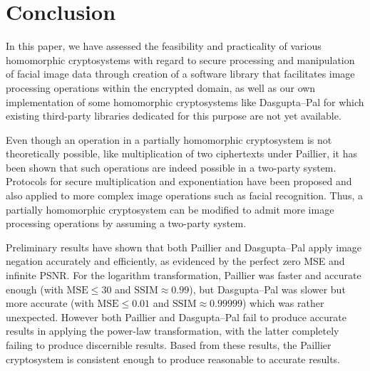 \begin{table}[h]
\begin{tabular}{lcccccc}
		\bottomrule
        \end{tabular}
\end{table}


\section{Conclusion}
In this paper, we have assessed the feasibility and practicality of various homomorphic cryptosystems with regard to secure processing and manipulation of facial image data through creation of a software library that facilitates image processing operations within the encrypted domain, as well as our own implementation of some homomorphic cryptosystems like Dasgupta--Pal for which existing third-party libraries dedicated for this purpose are not yet available.


Even though an operation in a partially homomorphic cryptosystem is not theoretically possible, like multiplication of two ciphertexts under Paillier, it has been shown that such operations are indeed possible in a two-party system. Protocols for secure multiplication and exponentiation have been proposed and also applied to more complex image operations such as facial recognition. Thus, a partially homomorphic cryptosystem can be modified to admit more image processing operations by assuming a two-party system.

Preliminary results have shown that both Paillier and Dasgupta--Pal apply image negation accurately and efficiently, as evidenced by the perfect zero MSE and infinite PSNR. For the logarithm transformation, Paillier was faster and accurate enough (with $\text{MSE} \le 30$ and $\text{SSIM} \approx 0.99$), but Dasgupta--Pal was slower but more accurate (with $\text{MSE} \le 0.01$ and $\text{SSIM} \approx 0.99999$) which was rather unexpected. However both Paillier and Dasgupta--Pal fail to produce accurate results in applying the power-law transformation, with the latter completely failing to produce discernible results. Based from these results, the Paillier cryptosystem is consistent enough to produce reasonable to accurate results.

